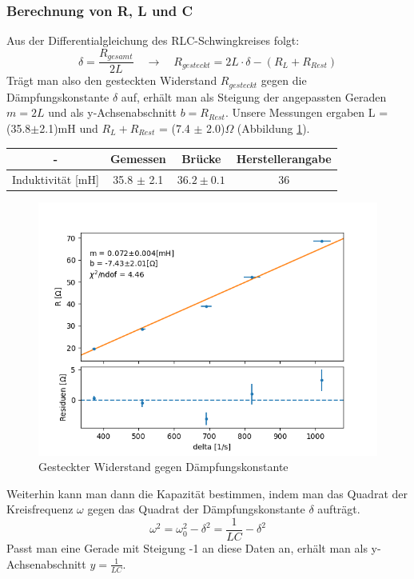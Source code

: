 \documentclass[12pt,a4paper]{article}
\begin{document}
\subsubsection{Berechnung von R, L und C}
Aus der Differentialgleichung des RLC-Schwingkreises folgt:
\begin{equation}
\delta = \frac{R_{gesamt}}{2L} \quad \rightarrow \quad R_{gesteckt} = 2 L \cdot \delta - (R_L + R_{Rest})
\end{equation}
Trägt man also den gesteckten Widerstand $R_{gesteckt}$ gegen die Dämpfungskonstante $\delta$ auf, erhält man als Steigung der angepassten Geraden $m = 2L$ und als y-Achsenabschnitt $b = R_{Rest}$. Unsere Messungen ergaben L = (35.8$\pm$2.1)mH und $R_L + R_{Rest}$ = (7.4 $\pm$ 2.0)$\Omega$ (Abbildung \ref{pic:fit_L_RLC}).

\begin{table}[H]
	\centering
	\begin{tabular}{|c|c|c|c|}
		\hline
		- & \textbf{Gemessen} & \textbf{Brücke} & \textbf{Herstellerangabe} \\
		\hline
		Induktivität [mH] & 35.8 $\pm$ 2.1 & $36.2 \pm 0.1$ & 36 \\
		\hline
	\end{tabular}
\end{table}

\begin{figure}
	\centering
	\includegraphics[width=0.8\linewidth]{Bilder/fit_L_RLC}
	\caption{Gesteckter Widerstand gegen Dämpfungskonstante}
	\label{pic:fit_L_RLC}
\end{figure}

Weiterhin kann man dann die Kapazität bestimmen, indem man das Quadrat der Kreisfrequenz $\omega$ gegen das Quadrat der Dämpfungskonstante $\delta$ aufträgt.
\begin{equation}
\omega^2 = \omega_0^2 -\delta^2 = \frac{1}{LC} - \delta^2
\end{equation}
Passt man eine Gerade mit Steigung -1 an diese Daten an, erhält man als y-Achsenabschnitt $y = \frac{1}{LC}$.
\end{document}
